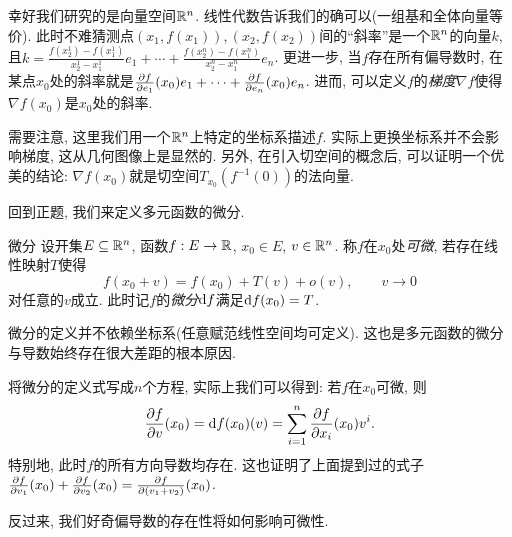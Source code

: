 幸好我们研究的是向量空间$\mathbb{R} ^n$. 线性代数告诉我们的确可以(一组基和全体向量等价). 此时不难猜测点$(x_1,f(x_1)),(x_2,f(x_2))$间的“斜率”是一个$\mathbb{R} ^n$的向量$k$, 且$k= \frac{f(x_2^1)-f(x_1^1)}{x_2^1-x_1^1}e_1 + \cdots + \frac{f(x_2^n)-f(x_1^n)}{x_2^n-x_1^n}e_n$. 更进一步, 当$f$存在所有偏导数时, 在某点$x_0$处的斜率就是$\frac{\partial f}{\partial e_1}(x_0)e_1 + \cdots + \frac{\partial f}{\partial e_n}(x_0)e_n$. 进而, 可以定义$f$的\textit{梯度}$\nabla f$使得$\nabla f(x_0)$是$x_0$处的斜率. 

需要注意, 这里我们用一个$\mathbb{R} ^n$上特定的坐标系描述$f$. 实际上更换坐标系并不会影响梯度, 这从几何图像上是显然的. 另外, 在引入切空间的概念后, 可以证明一个优美的结论: $\nabla f(x_0)$就是切空间$T_{x_0}(f^{-1}(0))$的法向量. 

回到正题, 我们来定义多元函数的微分. 

\begin{definition}{微分}
	设开集$E \subseteq \mathbb{R} ^n$, 函数$f: E \to \mathbb{R}$, $x_0 \in E$, $v \in \mathbb{R} ^n$. 称$f$在$x_0$处\textit{可微}, 若存在线性映射$T$使得$$f(x_0+v) = f(x_0) + T(v) + o(v),\qquad v \to 0$$
	对任意的$v$成立. 此时记$f$的\textit{微分}$\mathop{}\!\mathrm{d} f$满足$\mathop{}\!\mathrm{d} f(x_0)=T$. 
\end{definition}
\begin{remark}
	微分的定义并不依赖坐标系(任意赋范线性空间均可定义). 这也是多元函数的微分与导数始终存在很大差距的根本原因. 
\end{remark}

将微分的定义式写成$n$个方程, 实际上我们可以得到: 若$f$在$x_0$可微, 则$$ \frac{\partial f}{\partial v}(x_0) = \mathop{}\!\mathrm{d} f(x_0)(v) = \sum_{i=1}^{n} \frac{\partial f}{\partial x_i}(x_0)v^i.$$
特别地, 此时$f$的所有方向导数均存在. 这也证明了上面提到过的式子$\frac{\partial f}{\partial v_1}(x_0) + \frac{\partial f}{\partial v_2}(x_0) = \frac{\partial f}{\partial (v_1+v_2)}(x_0)$. 

反过来, 我们好奇偏导数的存在性将如何影响可微性. 

